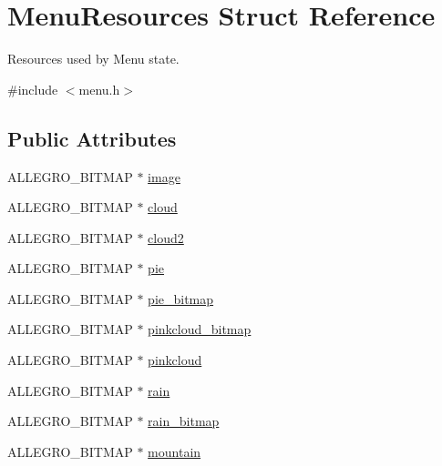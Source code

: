 \hypertarget{structMenuResources}{\section{Menu\+Resources Struct Reference}
\label{structMenuResources}
}


Resources used by Menu state.  




{\ttfamily \#include $<$menu.\+h$>$}

\subsection*{Public Attributes}
\begin{DoxyCompactItemize}
\item 
A\+L\+L\+E\+G\+R\+O\+\_\+\+B\+I\+T\+M\+A\+P $\ast$ \hyperlink{structMenuResources_a81135b3d5918d1e4e44e4cdaf48e9a5e}{image}
\item 
A\+L\+L\+E\+G\+R\+O\+\_\+\+B\+I\+T\+M\+A\+P $\ast$ \hyperlink{structMenuResources_adacdc1bac116ee31ee6343f00db02a4b}{cloud}
\item 
A\+L\+L\+E\+G\+R\+O\+\_\+\+B\+I\+T\+M\+A\+P $\ast$ \hyperlink{structMenuResources_a6ef8940eb594ce432b3073c1f16cf690}{cloud2}
\item 
A\+L\+L\+E\+G\+R\+O\+\_\+\+B\+I\+T\+M\+A\+P $\ast$ \hyperlink{structMenuResources_a4703db212d017bde65e4da5e52ab41e2}{pie}
\item 
A\+L\+L\+E\+G\+R\+O\+\_\+\+B\+I\+T\+M\+A\+P $\ast$ \hyperlink{structMenuResources_aa2d24eaa26d281daff97c3f6acc73476}{pie\+\_\+bitmap}
\item 
A\+L\+L\+E\+G\+R\+O\+\_\+\+B\+I\+T\+M\+A\+P $\ast$ \hyperlink{structMenuResources_a321c3df303778319e85ed6477377ae73}{pinkcloud\+\_\+bitmap}
\item 
A\+L\+L\+E\+G\+R\+O\+\_\+\+B\+I\+T\+M\+A\+P $\ast$ \hyperlink{structMenuResources_a95afab6c1ada7e273bcbc4e7e895cf62}{pinkcloud}
\item 
A\+L\+L\+E\+G\+R\+O\+\_\+\+B\+I\+T\+M\+A\+P $\ast$ \hyperlink{structMenuResources_afb9b34f1dea1440aa0171a06f9957e49}{rain}
\item 
A\+L\+L\+E\+G\+R\+O\+\_\+\+B\+I\+T\+M\+A\+P $\ast$ \hyperlink{structMenuResources_aa018f4cd7de72e3ddca03be279f655f2}{rain\+\_\+bitmap}
\item 
A\+L\+L\+E\+G\+R\+O\+\_\+\+B\+I\+T\+M\+A\+P $\ast$ \hyperlink{structMenuResources_a2e838d21a796a612e8850639afd9641e}{mountain}
\item 

\end{DoxyCompactItemize}
